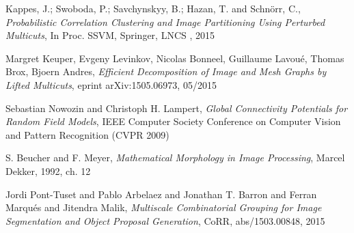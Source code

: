 \documentclass{beamer}
\begin{document}
\begin{thebibliography}{9}
 	Kappes, J.; Swoboda, P.; Savchynskyy, B.; Hazan, T. and Schnörr, C., 
 	\emph{Probabilistic Correlation Clustering and Image Partitioning Using Perturbed Multicuts}, 
 	 In Proc. SSVM, Springer, LNCS , 2015
 	 
 	Margret Keuper, Evgeny Levinkov, Nicolas Bonneel, Guillaume Lavoué, Thomas Brox, Bjoern Andres, 
 	\emph{Efficient Decomposition of Image and Mesh Graphs by Lifted Multicuts}, 
 	eprint arXiv:1505.06973, 05/2015
 	

	Sebastian Nowozin and Christoph H. Lampert, 
	\emph{Global Connectivity Potentials for Random Field Models}, 
	IEEE Computer Society Conference on Computer Vision and Pattern Recognition (CVPR 2009)

 	S. Beucher and F. Meyer,
 	\emph{Mathematical  Morphology  in  Image  Processing}, 
 	Marcel Dekker, 1992, ch. 12

 	Jordi Pont{-}Tuset and Pablo Arbelaez and Jonathan T. Barron and Ferran Marqu{\'{e}}s and Jitendra Malik, 
 	\emph{Multiscale Combinatorial Grouping for Image Segmentation and Object Proposal Generation}, 
 	CoRR, abs/1503.00848, 2015

\end{thebibliography}
	
	
	
	
	
	

	
	
\end{document}
